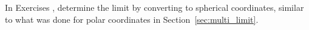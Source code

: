 {\noindent In Exercises}
{, determine the limit by converting to spherical coordinates, similar to what was done for polar coordinates in Section~\ref{sec:multi_limit}.}
